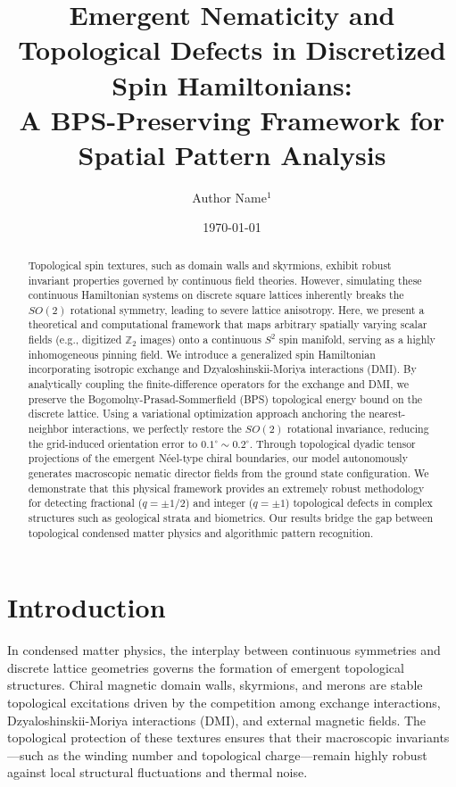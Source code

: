 \documentclass[reprint,amsmath,amssymb,aps,prapplied,longbibliography]{revtex4-2}
\begin{document}
\title{Emergent Nematicity and Topological Defects in Discretized Spin Hamiltonians:\\ A BPS-Preserving Framework for Spatial Pattern Analysis}

\author{Author Name$^{1}$}

\date{\today}

\begin{abstract}
Topological spin textures, such as domain walls and skyrmions, exhibit robust invariant properties governed by continuous field theories. However, simulating these continuous Hamiltonian systems on discrete square lattices inherently breaks the $SO(2)$ rotational symmetry, leading to severe lattice anisotropy. Here, we present a theoretical and computational framework that maps arbitrary spatially varying scalar fields (e.g., digitized $\mathbb{Z}_2$ images) onto a continuous $S^2$ spin manifold, serving as a highly inhomogeneous pinning field. We introduce a generalized spin Hamiltonian incorporating isotropic exchange and Dzyaloshinskii-Moriya interactions (DMI). By analytically coupling the finite-difference operators for the exchange and DMI, we preserve the Bogomolny-Prasad-Sommerfield (BPS) topological energy bound on the discrete lattice. Using a variational optimization approach anchoring the nearest-neighbor interactions, we perfectly restore the $SO(2)$ rotational invariance, reducing the grid-induced orientation error to $0.1^\circ \sim 0.2^\circ$. Through topological dyadic tensor projections of the emergent Néel-type chiral boundaries, our model autonomously generates macroscopic nematic director fields from the ground state configuration. We demonstrate that this physical framework provides an extremely robust methodology for detecting fractional ($q = \pm 1/2$) and integer ($q = \pm 1$) topological defects in complex structures such as geological strata and biometrics. Our results bridge the gap between topological condensed matter physics and algorithmic pattern recognition.
\end{abstract}

\maketitle

\section{Introduction}
In condensed matter physics, the interplay between continuous symmetries and discrete lattice geometries governs the formation of emergent topological structures. Chiral magnetic domain walls, skyrmions, and merons are stable topological excitations driven by the competition among exchange interactions, Dzyaloshinskii-Moriya interactions (DMI), and external magnetic fields. The topological protection of these textures ensures that their macroscopic invariants—such as the winding number and topological charge—remain highly robust against local structural fluctuations and thermal noise.
\end{document}
